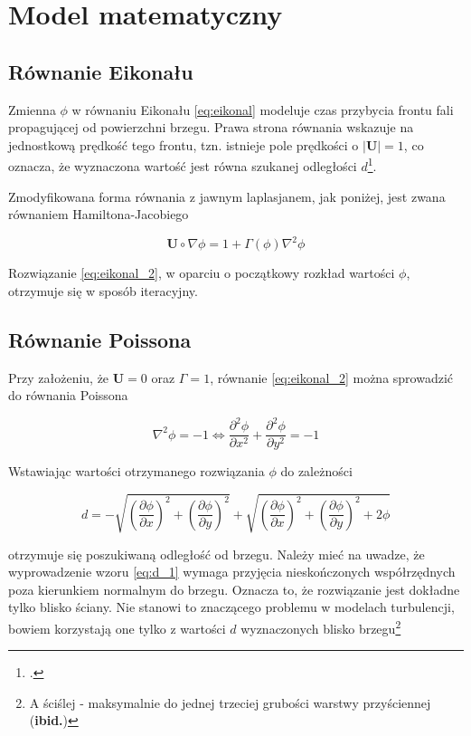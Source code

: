\chapter{Model matematyczny}

\section{Równanie Eikonału}

\indent\indent Zmienna $\phi$ w równaniu Eikonału \ref{eq:eikonal} modeluje czas przybycia frontu fali propagującej od powierzchni brzegu. Prawa strona równania wskazuje na jednostkową prędkość tego frontu, tzn. istnieje pole prędkości o $|\textbf{U}|=1$, co oznacza, że wyznaczona wartość jest równa szukanej odległości $d$\footcite{Tucker}.

\indent Zmodyfikowana forma równania z jawnym laplasjanem, jak poniżej, jest zwana równaniem Hamiltona-Jacobiego

\begin{equation}
\textbf{U}\circ\nabla\phi = 1 + \Gamma(\phi)\nabla^2\phi
\label{eq:eikonal_2}
\end{equation}

\indent Rozwiązanie \ref{eq:eikonal_2}, w oparciu o początkowy rozkład wartości $\phi$, otrzymuje się w sposób iteracyjny.
\section{Równanie Poissona}
\indent\indent Przy założeniu, że $\textbf{U}=0$ oraz $\Gamma = 1$, równanie \ref{eq:eikonal_2} można sprowadzić do równania Poissona 

\begin{equation}
\nabla^2 \phi = -1 \iff \frac{\partial^2 \phi}{\partial x^2} + \frac{\partial^2 \phi}{\partial y^2} = -1
\label{eq:poisson_1}
\end{equation}

\noindent Wstawiając wartości otrzymanego rozwiązania $\phi$ do zależności


\begin{equation}
d = - \sqrt{\left(\frac{\partial\phi}{\partial x}\right)^2+\left(\frac{\partial\phi}{\partial y}\right)^2}+\sqrt{\left(\frac{\partial\phi}{\partial x}\right)^2+\left(\frac{\partial\phi}{\partial y}\right)^2+2\phi}
\label{eq:d_1}
\end{equation}

\noindent otrzymuje się poszukiwaną odległość od brzegu. Należy mieć na uwadze, że wyprowadzenie wzoru \ref{eq:d_1} wymaga przyjęcia nieskończonych współrzędnych poza kierunkiem normalnym do brzegu. Oznacza to, że rozwiązanie jest dokładne tylko blisko ściany. Nie stanowi to znaczącego problemu w modelach turbulencji, bowiem korzystają one tylko z wartości $d$ wyznaczonych blisko brzegu\footnote{A ściślej - maksymalnie do jednej trzeciej grubości warstwy przyściennej (\textbf{ibid.})}

